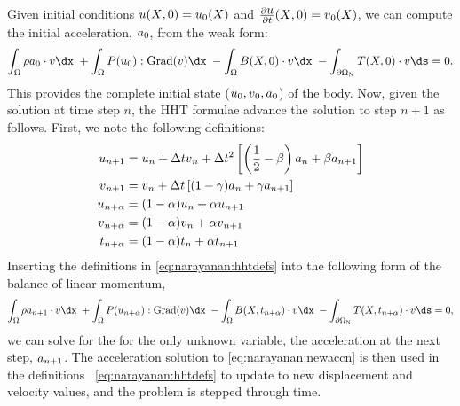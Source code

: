 Given initial conditions $\mbox{$ u$}(\mbox{$ X$}, 0) = \mbox{$ u$}_{0}(\mbox{$ X$})$ and
$\frac{\partial\mbox{$ u$}}{\partial t}(\mbox{$ X$}, 0) = \mbox{$ v$}_{0}(\mbox{$ X$})$, we can
compute the initial acceleration, $\mbox{$ a$}_{0}$, from the weak form:\vspace*{-2pt}
\begin{equation}
  \int_{\Omega} \rho a_{0} \cdot \bv \dx\; +  \int_{\Omega}
  \bP(u_{0}):\mathrm{Grad}(\bv) \dx\; - \int_{\Omega} \bB(X, 0)
  \cdot \bv \dx\; -  \int_{\partial\Omega_{\mathrm{N}}}
  \bT(X, 0) \cdot \bv \ds = 0.\vspace*{-2pt}
\end{equation}
This provides the complete initial state ($\mbox{$ u$}_{0}, \mbox{$ v$}_{0}, \mbox{$ a$}_{0}$)
of the body. Now, given the solution at time step $n$, the HHT formulae
advance the solution to step $n+1$ as follows. First, we note the
following definitions:\vspace*{-2pt}
\begin{equation}
  \begin{split}
    \bu_{n+1} & = \bu_{n} + \Delta t \bv_{n} + \Delta t^{2} \left[
      \left(\frac{1}{2} - \beta \right) \ba_{n} + \beta \ba_{n+1}
    \right]\\
    \bv_{n+1} & = \bv_{n} + \Delta t \left[ (1-\gamma) \ba_{n} +
      \gamma \ba_{n+1} \right]\\
    \bu_{n+\alpha} & = (1 - \alpha) \bu_{n} + \alpha \bu_{n+1}\\
    \bv_{n+\alpha} & = (1 - \alpha) \bv_{n} + \alpha \bv_{n+1}\\
    t_{n+\alpha} &= (1 - \alpha) t_{n} + \alpha t_{n + 1}\vspace*{-2pt}
\end{split}
\label{eq:narayanan:hhtdefs}
\end{equation}
Inserting the definitions in \eqref{eq:narayanan:hhtdefs}
into the following form of the balance of linear momentum,\vspace*{-2pt}
\begin{equation}
   \int_{\Omega} \rho a_{n+1} \cdot \bv \dx\; + \int_{\Omega} \bP(u_{n
     + \alpha}):\mathrm{Grad}(\bv) \dx\; - \int_{\Omega} \bB(X, t_{n +
     \alpha}) \cdot \bv \dx\; - \int_{\partial\Omega_{\mathrm{N}}}
   \bT(X, t_{n + \alpha}) \cdot \bv \ds = 0,
\label{eq:narayanan:newaccn}
\end{equation}
we can solve for the for the only unknown variable, the acceleration
at the next step, $\mbox{$ a$}_{n+1}$. The acceleration solution to
\eqref{eq:narayanan:newaccn} is then used in the definitions%
~\eqref{eq:narayanan:hhtdefs} to update to new displacement and
velocity values, and the problem is stepped through time.

